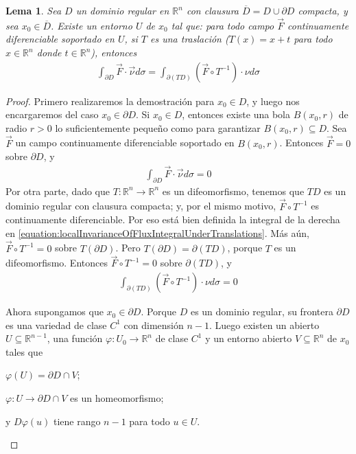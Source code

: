 \documentclass{report}
\newcommand{\realNumbers}{\mathbb{R}}
\newtheorem{lemma}{Lema}
\theoremstyle{definition}
\theoremstyle{remark}
\begin{document}
  \begin{lemma}
    Sea \(D\) un dominio regular en \(\realNumbers^n\) con clausura \(\overline{D} = D \cup \partial D\) compacta, y sea \(x_0 \in \overline{D}\).
    Existe un entorno \(U\) de \(x_0\) tal que:
    para todo campo \(\vec{F}\) continuamente diferenciable soportado en \(U\), si \(T\) es una traslación (\(T(x) = x + t\) para todo \(x \in \realNumbers^n\) donde \(t \in \realNumbers^n\)), entonces
    \begin{align}
      \label{equation:localInvarianceOfFluxIntegralUnderTranslations}
      \int_{\partial D} \vec{F} \cdot \vec{\nu} d \sigma
      =
      \int_{\partial (T D)} (\vec{F} \circ T^{- 1}) \cdot \nu d \sigma
    \end{align}
  \end{lemma}
  \begin{proof}
    Primero realizaremos la demostración para \(x_0 \in D\), y luego nos encargaremos del caso \(x_0 \in \partial D\).
    Si \(x_0 \in D\), entonces existe una bola \(B(x_0, r)\) de radio \(r > 0\) lo suficientemente pequeño como para garantizar \(B(x_0, r) \subseteq D\).
    Sea \(\vec{F}\) un campo continuamente diferenciable soportado en \(B(x_0, r)\).
    Entonces \(\vec{F} = 0\) sobre \(\partial D\), y 
    \begin{align}
      \int_{\partial D} \vec{F} \cdot \vec{\nu} d \sigma
      =
      0
    \end{align}
    Por otra parte, dado que \(T : \realNumbers^n \rightarrow \realNumbers^n\) es un difeomorfismo, tenemos que \(T D\) es un dominio regular con clausura compacta;
    y, por el mismo motivo, \(\vec{F} \circ T^{- 1}\) es continuamente diferenciable.
    Por eso está bien definida la integral de la derecha en \eqref{equation:localInvarianceOfFluxIntegralUnderTranslations}.
    Más aún, \(\vec{F} \circ T^{- 1} = 0\) sobre \(T(\partial D)\).
    Pero \(T(\partial D) = \partial(T D)\), porque \(T\) es un difeomorfismo.
    Entonces \(\vec{F} \circ T^{- 1} = 0\) sobre \(\partial (T D)\), y 
    \begin{align}
      \int_{\partial (T D)} (\vec{F} \circ T^{- 1}) \cdot \nu d \sigma
      =
      0
    \end{align}

    Ahora supongamos que \(x_0 \in \partial D\).
    Porque \(D\) es un dominio regular, su frontera \(\partial D\) es una variedad de clase \(C^1\) con dimensión \(n - 1\).
    Luego existen un abierto \(U \subseteq \realNumbers^{n - 1}\), una función \(\varphi : U_0 \rightarrow \realNumbers^n\) de clase \(C^1\) y un entorno abierto \(V \subseteq \realNumbers^n\) de \(x_0\) tales que 
    \begin{enumerate*}
      \item \(\varphi(U) = \partial D \cap V\);
      \item \(\varphi : U \rightarrow \partial D \cap V\) es un homeomorfismo;
      \item y \(D \varphi (u)\) tiene rango \(n - 1\) para todo \(u \in U\).
    \end{enumerate*}



\end{proof}
\end{document}
